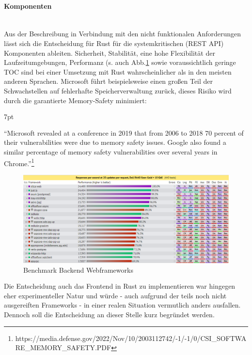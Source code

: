 \documentclass[notitlepage, hidelinks]{article}
\newenvironment{formal}{%
  \def\FrameCommand{%
    \hspace{1pt}%
    {\color{black}\vrule width 2pt}%
    {\color{formalshade}\vrule width 4pt}%
    \colorbox{formalshade}%
  }%
  \MakeFramed{\advance\hsize-\width\FrameRestore}%
  \noindent\hspace{-4.55pt}%
  \begin{adjustwidth}{}{7pt}%
  \vspace{2pt}\vspace{2pt}%
}
{%
  \vspace{2pt}\end{adjustwidth}\endMakeFramed%
}
\begin{document}
\paragraph{Komponenten} \mbox{} \\
Aus der Beschreibung in Verbindung mit den nicht funktionalen Anforderungen lässt sich die Entscheidung für Rust für die systemkritischen (REST API) Komponenten ableiten. Sicherheit, Stabilität, eine hohe Flexibilität der Laufzeitumgebungen, Performanz (s. auch Abb.\ref{fig:apibenchmark} sowie voraussichtlich geringe TOC sind bei einer Umsetzung mit Rust wahrscheinlicher als in den meisten anderen Sprachen. Microsoft führt beispielsweise einen großen Teil der Schwachstellen auf fehlerhafte Speicherverwaltung zurück, dieses Risiko wird durch die garantierte Memory-Safety minimiert:
\begin{formal}
``Microsoft revealed at a conference in 2019 that from 2006 to 2018 70 percent of their vulnerabilities were due to memory safety issues. Google also found a similar percentage of memory safety vulnerabilities over several years in Chrome.''\footnote{https://media.defense.gov/2022/Nov/10/2003112742/-1/-1/0/CSI\_SOFTWARE\_MEMORY\_SAFETY.PDF}
\end{formal}


\begin{figure}[H]
\centering
  \includegraphics[width=\textwidth]{images/score3.png}
  \caption{Benchmark Backend Webframeworks}
  \label{fig:apibenchmark}
\end{figure}


Die Entscheidung auch das Frontend in Rust zu implementieren war hingegen eher experimenteller Natur und würde - auch aufgrund der teils noch nicht ausgereiften Frameworks - in einer realen Situation vermutlich anders ausfallen. Dennoch soll die Entscheidung an dieser Stelle kurz begründet werden. \\
\end{document}
